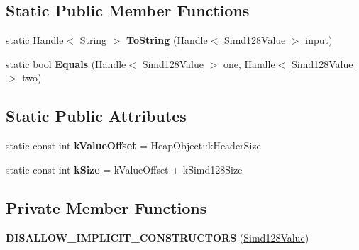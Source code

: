 \subsection*{Static Public Member Functions}
\begin{DoxyCompactItemize}
\item 
static \hyperlink{classv8_1_1internal_1_1_handle}{Handle}$<$ \hyperlink{classv8_1_1internal_1_1_string}{String} $>$ {\bfseries To\+String} (\hyperlink{classv8_1_1internal_1_1_handle}{Handle}$<$ \hyperlink{classv8_1_1internal_1_1_simd128_value}{Simd128\+Value} $>$ input)\hypertarget{classv8_1_1internal_1_1_simd128_value_abde476ac8084795dd11cbe20e4a47d97}{}\label{classv8_1_1internal_1_1_simd128_value_abde476ac8084795dd11cbe20e4a47d97}

\item 
static bool {\bfseries Equals} (\hyperlink{classv8_1_1internal_1_1_handle}{Handle}$<$ \hyperlink{classv8_1_1internal_1_1_simd128_value}{Simd128\+Value} $>$ one, \hyperlink{classv8_1_1internal_1_1_handle}{Handle}$<$ \hyperlink{classv8_1_1internal_1_1_simd128_value}{Simd128\+Value} $>$ two)\hypertarget{classv8_1_1internal_1_1_simd128_value_aecf7509e4106b92194eb008c074f799d}{}\label{classv8_1_1internal_1_1_simd128_value_aecf7509e4106b92194eb008c074f799d}

\end{DoxyCompactItemize}
\subsection*{Static Public Attributes}
\begin{DoxyCompactItemize}
\item 
static const int {\bfseries k\+Value\+Offset} = Heap\+Object\+::k\+Header\+Size\hypertarget{classv8_1_1internal_1_1_simd128_value_a84a460b86524472b9e1d0b238427f877}{}\label{classv8_1_1internal_1_1_simd128_value_a84a460b86524472b9e1d0b238427f877}

\item 
static const int {\bfseries k\+Size} = k\+Value\+Offset + k\+Simd128\+Size\hypertarget{classv8_1_1internal_1_1_simd128_value_a845aeeac9e9cb5e92c95aaf9fd171dbe}{}\label{classv8_1_1internal_1_1_simd128_value_a845aeeac9e9cb5e92c95aaf9fd171dbe}

\end{DoxyCompactItemize}
\subsection*{Private Member Functions}
\begin{DoxyCompactItemize}
\item 
{\bfseries D\+I\+S\+A\+L\+L\+O\+W\+\_\+\+I\+M\+P\+L\+I\+C\+I\+T\+\_\+\+C\+O\+N\+S\+T\+R\+U\+C\+T\+O\+RS} (\hyperlink{classv8_1_1internal_1_1_simd128_value}{Simd128\+Value})\hypertarget{classv8_1_1internal_1_1_simd128_value_acc3bf39d19e1fe5814d719c8b4fea0f2}{}\label{classv8_1_1internal_1_1_simd128_value_acc3bf39d19e1fe5814d719c8b4fea0f2}

\end{DoxyCompactItemize}
